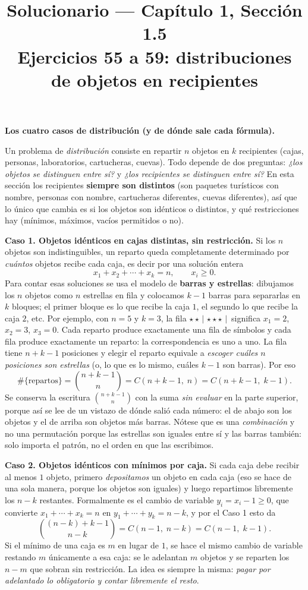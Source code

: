 \documentclass[11pt]{article}
\title{Solucionario --- Cap\'itulo 1, Secci\'on 1.5\\ Ejercicios 55 a 59: distribuciones de objetos en recipientes}
\author{}
\date{}
\begin{document}
\maketitle

\begin{teo}
\textbf{Los cuatro casos de distribución (y de dónde sale cada fórmula).}

Un problema de \emph{distribución} consiste en repartir $n$ objetos en $k$ recipientes (cajas, personas, laboratorios, cartucheras, cuevas). Todo depende de dos preguntas: \emph{¿los objetos se distinguen entre sí?} y \emph{¿los recipientes se distinguen entre sí?} En esta sección los recipientes \textbf{siempre son distintos} (son paquetes turísticos con nombre, personas con nombre, cartucheras diferentes, cuevas diferentes), así que lo único que cambia es si los objetos son idénticos o distintos, y qué restricciones hay (mínimos, máximos, vacíos permitidos o no).

\medskip
\textbf{Caso 1. Objetos idénticos en cajas distintas, sin restricción.}
Si los $n$ objetos son indistinguibles, un reparto queda completamente determinado por \emph{cuántos} objetos recibe cada caja, es decir por una solución entera
\[
x_1+x_2+\cdots+x_k=n,\qquad x_i\ge 0 .
\]
Para contar esas soluciones se usa el modelo de \textbf{barras y estrellas}: dibujamos los $n$ objetos como $n$ estrellas en fila y colocamos $k-1$ barras para separarlas en $k$ bloques; el primer bloque es lo que recibe la caja $1$, el segundo lo que recibe la caja $2$, etc. Por ejemplo, con $n=5$ y $k=3$, la fila $\star\star\,|\,\star\star\star\,|\,$ significa $x_1=2$, $x_2=3$, $x_3=0$. Cada reparto produce exactamente una fila de símbolos y cada fila produce exactamente un reparto: la correspondencia es uno a uno. La fila tiene $n+k-1$ posiciones y elegir el reparto equivale a \emph{escoger cuáles $n$ posiciones son estrellas} (o, lo que es lo mismo, cuáles $k-1$ son barras). Por eso
\[
\#\{\text{repartos}\}=\binom{n+k-1}{n}=C(n+k-1,\;n)=C(n+k-1,\;k-1).
\]
Se conserva la escritura $\binom{n+k-1}{n}$ con la suma \emph{sin evaluar} en la parte superior, porque así se lee de un vistazo de dónde salió cada número: el de abajo son los objetos y el de arriba son objetos más barras. Nótese que es una \emph{combinación} y no una permutación porque las estrellas son iguales entre sí y las barras también: solo importa el patrón, no el orden en que las escribimos.

\medskip
\textbf{Caso 2. Objetos idénticos con mínimos por caja.}
Si cada caja debe recibir al menos $1$ objeto, primero \emph{depositamos} un objeto en cada caja (eso se hace de una sola manera, porque los objetos son iguales) y luego repartimos libremente los $n-k$ restantes. Formalmente es el cambio de variable $y_i=x_i-1\ge 0$, que convierte $x_1+\cdots+x_k=n$ en $y_1+\cdots+y_k=n-k$, y por el Caso 1 esto da
\[
\binom{(n-k)+k-1}{n-k}=C(n-1,\;n-k)=C(n-1,\;k-1).
\]
Si el mínimo de una caja es $m$ en lugar de $1$, se hace el mismo cambio de variable restando $m$ únicamente a esa caja: se le adelantan $m$ objetos y se reparten los $n-m$ que sobran sin restricción. La idea es siempre la misma: \emph{pagar por adelantado lo obligatorio y contar libremente el resto}.


\end{teo}
\end{document}

